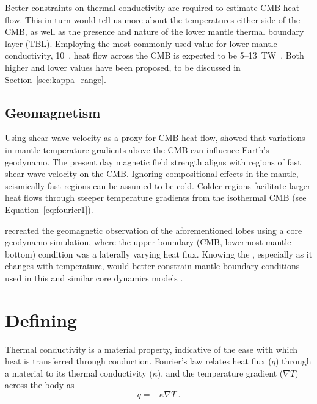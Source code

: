 Better constraints on thermal conductivity are required to estimate CMB heat flow. This in turn would tell us more about the temperatures either side of the CMB, as well as the presence and nature of the lower mantle thermal boundary layer (TBL). Employing the most commonly used value for lower mantle conductivity, 10~\wmk, heat flow across the CMB is expected to be 5--13~TW~\citep{Lay2008}. Both higher and lower values have been proposed, to be discussed in Section~\ref{sec:kappa_range}.


\subsection{Geomagnetism}

Using shear wave velocity as a proxy for CMB heat flow, \citet{Gubbins2007} showed that variations in mantle temperature gradients above the CMB can influence Earth's geodynamo. The present day magnetic field strength aligns with regions of fast shear wave velocity on the CMB. Ignoring compositional effects in the mantle, seismically-fast regions can be assumed to be cold. Colder regions facilitate larger heat flows through steeper temperature gradients from the isothermal CMB (see Equation~\ref{eq:fourier1}).

\citet{Gubbins2007} recreated the geomagnetic observation of the aforementioned lobes using a core geodynamo simulation, where the upper boundary (CMB, lowermost mantle bottom) condition was a laterally varying heat flux. Knowing the \tc, especially as it changes with temperature, would better constrain mantle boundary conditions used in this and similar core dynamics models \citep{Ammann2014}.








\section{Defining \tc}
\label{sec:defining_tc}

Thermal conductivity is a material property, indicative of the ease with which heat is transferred through conduction. Fourier's law relates heat flux ($q$) through a material to its thermal conductivity ($\kappa$), and the temperature gradient ($\nabla{T}$) across the body as
%
\begin{equation}
q=-\kappa \nabla{T}\ . 
\label{eq:fourier1}
\end{equation}

